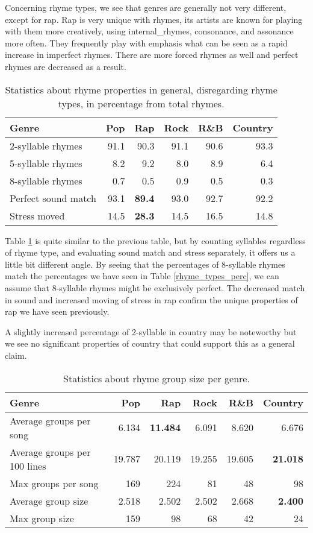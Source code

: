Concerning rhyme types, we see that genres are generally not very different, except for rap. Rap is very unique with rhymes, its artists are known for playing with them more creatively, using \gls{internal_rhyme}s, consonance, and assonance more often. They frequently play with emphasis what can be seen as a rapid increase in imperfect rhymes. There are more forced rhymes as well and perfect rhymes are decreased as a result.

\begin{table}[h!]
	\centering
	\begin{tabular}{l | r r r r r} 	
		Genre & 			Pop & 		Rap & 		Rock & 		R\&B & 		Country\\ 
		\midrule
		2-syllable rhymes & 91.1& 90.3& 91.1& 90.6 & 93.3\\
		5-syllable rhymes& 8.2& 9.2& 8.0& 8.9& 6.4  \\
		8-syllable rhymes& 0.7& 0.5& 0.9& 0.5& 0.3 \\
		Perfect sound match & 93.1&\textbf{ 89.4}& 93.0& 92.7& 92.2  \\
		Stress moved & 14.5& \textbf{28.3}& 14.5& 16.5& 14.8 \\
		
	\end{tabular}
	\caption{Statistics about rhyme properties in general, disregarding rhyme types, in percentage from total rhymes.} 
	\label{rhyme_stats}
\end{table}

Table \ref{rhyme_stats} is quite similar to the previous table, but by counting syllables regardless of rhyme type, and evaluating sound match and stress separately, it offers us a little bit different angle. By seeing that the percentages of 8-syllable rhymes match the percentages we have seen in Table \ref{rhyme_types_perc}, we can assume that 8-syllable rhymes might be exclusively perfect. The decreased match in sound and increased moving of stress in rap confirm the unique properties of rap we have seen previously.

A slightly increased percentage of 2-syllable in country may be noteworthy but we see no significant properties of country that could support this as a general claim.

\begin{table}[h!]
	\centering
	\begin{tabular}{l | r r r r r} 	
		Genre & 			Pop & 		Rap & 		Rock & 		R\&B & 		Country\\ 
		\midrule
		Average groups per song& 6.134 &\textbf{11.484} &6.091 &8.620 &6.676  \\
		Average groups per 100 lines &19.787 &20.119 &19.255 &19.605 &\textbf{21.018} \\
		Max groups per song & 169 &224 & 81 & 48 &98\\
		Average group size & 2.518 &2.502 &2.502 &2.668 &\textbf{2.400} \\
		Max group size & 159 &98 & 68 & 42 & 24\\
	\end{tabular}
	\caption{Statistics about rhyme group size per genre.} 
	\label{rhyme_group_size}
\end{table}

